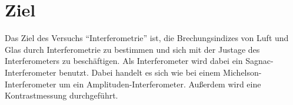 \section{Ziel}
\label{sec:Ziel}

Das Ziel des Versuchs \enquote{Interferometrie} ist, die Brechungsindizes von Luft und Glas durch Interferometrie zu bestimmen und sich mit der Justage des Interferometers zu beschäftigen.
Als Interferometer wird dabei ein Sagnac-Interferometer benutzt.
Dabei handelt es sich wie bei einem Michelson-Interferometer um ein Amplituden-Interferometer.
Außerdem wird eine Kontrastmessung durchgeführt.